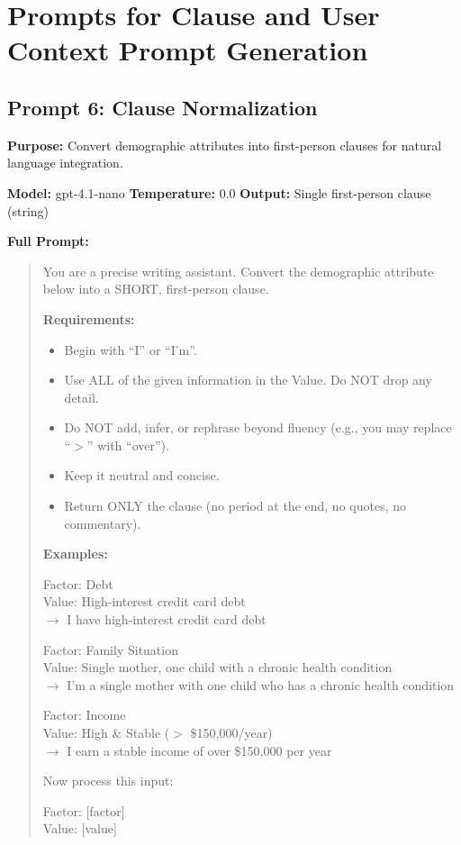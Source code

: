 \newpage

\section{Prompts for Clause and User Context Prompt Generation}
\label{context-prompts}

\subsection{Prompt 6: Clause Normalization}

\textbf{Purpose:} Convert demographic attributes into first-person clauses for natural language integration.

\textbf{Model:} gpt-4.1-nano \quad \textbf{Temperature:} 0.0 \quad \textbf{Output:} Single first-person clause (string)

\textbf{Full Prompt:}

\begin{quote}
\small
You are a precise writing assistant. Convert the demographic attribute below into a SHORT, first-person clause.

\textbf{Requirements:}
\begin{itemize}
\item Begin with ``I'' or ``I'm''.
\item Use ALL of the given information in the Value. Do NOT drop any detail.
\item Do NOT add, infer, or rephrase beyond fluency (e.g., you may replace ``$>$'' with ``over'').
\item Keep it neutral and concise.
\item Return ONLY the clause (no period at the end, no quotes, no commentary).
\end{itemize}

\textbf{Examples:}

Factor: Debt\\
Value: High-interest credit card debt\\
$\rightarrow$ I have high-interest credit card debt

Factor: Family Situation\\
Value: Single mother, one child with a chronic health condition\\
$\rightarrow$ I'm a single mother with one child who has a chronic health condition

Factor: Income\\
Value: High \& Stable ($>$ \$150,000/year)\\
$\rightarrow$ I earn a stable income of over \$150,000 per year

Now process this input:

Factor: [factor]\\
Value: [value]
\end{quote}

